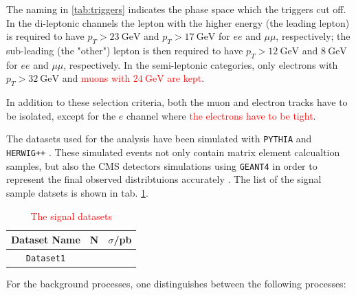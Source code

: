 The naming in \ref{tab:triggers} indicates the phase space which the triggers cut off. In the di-leptonic channels the lepton with the higher energy (the leading lepton) is required to have $p_T > \SI{23}{\giga\electronvolt}$ and $p_T > \SI{17}{\giga\electronvolt}$ for $ee$ and $\mu\mu$, respectively; the sub-leading (the "other") lepton is then required to have $p_T>\SI{12}{\giga\electronvolt}$ and $\SI{8}{\giga\electronvolt}$ for $ee$ and $\mu\mu$, respectively. In the semi-leptonic categories, only electrons with $p_T>\SI{32}{\giga\electronvolt}$ and \textcolor{red}{muons with $\SI{24}{\giga\electronvolt}$ are kept}.

In addition to these selection criteria, both the muon and electron tracks have to be isolated, except for the $e$ channel where \textcolor{red}{the electrons have to be tight}.

The datasets used for the analysis have been simulated with \texttt{PYTHIA} \cite{Sj_strand_2008} and \texttt{HERWIG++} \cite{herwig}. These simulated events not only contain matrix element calcualtion samples, but also the CMS detectors simulations using \texttt{GEANT4} in order to represent the final observed distribtuions accurately \cite{geant1, geant2, geant3}. The list of the signal sample datsets is shown in tab. \ref{tab:signal_datasets}.

\begin{table}[h!]
	\centering
	\begin{tabular}{ccc}
		Dataset Name & N & $\sigma$/pb \\
		\hline
		\texttt{Dataset1} & & \\
	\end{tabular}
	\caption{\textcolor{red}{The signal datasets}}
	\label{tab:signal_datasets}
\end{table}

For the background processes, one distinguishes between the following processes:

